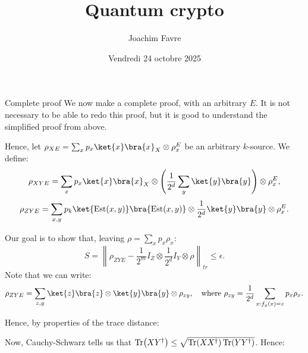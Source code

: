 \documentclass[a4paper]{article}
\title{Quantum crypto}
\author{Joachim Favre}
\date{Vendredi 24 octobre 2025}
\begin{document}
\maketitle


\begin{parag}{}
    \begin{subparag}{Complete proof}
        We now make a complete proof, with an arbitrary $E$. It is not necessary to be able to redo this proof, but it is good to understand the simplified proof from above.

        Hence, let $\rho_{XE} = \sum_{x} p_x \ket{x}\bra{x}_X \otimes \rho_x^E$ be an arbitrary $k$-source. We define: 
        \[\rho_{XYE} = \sum_{x} p_x \ket{x}\bra{x}_X \otimes \left(\frac{1}{2^d} \sum_{y} \ket{y}\bra{y}\right) \otimes \rho_x^E,\]
        \[\rho_{ZYE} = \sum_{x, y} p_k \ket{\text{Est}\left(x, y\right)}\bra{\text{Est}\left(x, y\right)} \otimes \frac{1}{2^d} \ket{y}\bra{y} \otimes \rho_x^E.\]

        Our goal is to show that, leaving $\rho = \sum_{x} p_x \rho_x$: 
        \[S = \left\|\rho_{ZYE} - \frac{1}{2^m} I_Z \otimes \frac{1}{2^d} I_Y \otimes \rho\right\|_{tr} \leq \epsilon.\]
        Note that we can write: 
        \[\rho_{ZYE} = \sum_{z, y} \ket{z}\bra{z} \otimes \ket{y}\bra{y} \otimes \rho_{zy}, \mathspace \text{where } \rho_{zy} = \frac{1}{2^d} \sum_{x: f_y\left(x\right) = z} p_x \rho_x.\]
        
        Hence, by properties of the trace distance: 
        
        Now, Cauchy-Schwarz tells us that $\Tr\left(X Y^{\dagger}\right) \leq \sqrt{\Tr\left(X X^{\dagger}\right) \Tr\left(Y Y^{\dagger}\right)}$. Hence: 


\end{subparag}
\end{parag}
\end{document}
